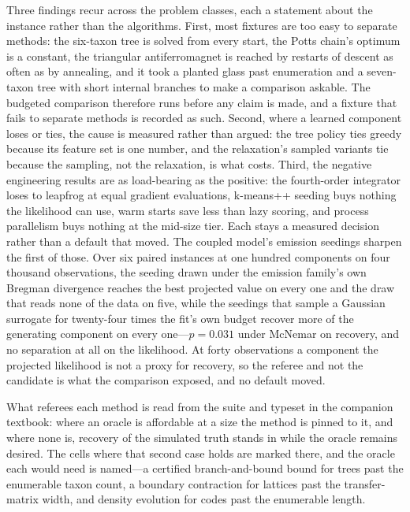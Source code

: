 \documentclass[11pt,a4paper]{article}
\begin{document}
Three findings recur across the problem classes, each a statement about the
instance rather than the algorithms. First, most fixtures are too easy to
separate methods: the six-taxon tree is solved from every start, the Potts
chain's optimum is a constant, the triangular antiferromagnet is reached by
restarts of descent as often as by annealing, and it took a planted glass past
enumeration and a seven-taxon tree with short internal branches to make a
comparison askable. The budgeted comparison therefore runs before any claim is
made, and a fixture that fails to separate methods is recorded as such. Second,
where a learned component loses or ties, the cause is measured rather than
argued: the tree policy ties greedy because its feature set is one number, and
the relaxation's sampled variants tie because the sampling, not the relaxation,
is what costs. Third, the negative engineering results are as load-bearing as
the positive: the fourth-order integrator loses to leapfrog at equal gradient
evaluations, k-means++ seeding buys nothing the likelihood can use, warm starts
save less than lazy scoring, and process parallelism buys nothing at the
mid-size tier. Each stays a measured decision rather than a default that moved.
The coupled model's emission seedings sharpen the first of those. Over six
paired instances at one hundred components on four thousand observations, the
seeding drawn under the emission family's own Bregman divergence reaches the
best projected value on every one and the draw that reads none of the data on
five, while the seedings that sample a Gaussian surrogate for twenty-four times
the fit's own budget recover more of the generating component on every
one---$p = 0.031$ under McNemar on recovery, and no separation at all on the
likelihood. At forty observations a component the projected likelihood is not a
proxy for recovery, so the referee and not the candidate is what the comparison
exposed, and no default moved.

What referees each method is read from the suite and typeset in the
companion textbook: where an oracle is affordable at a size the method is
pinned to it, and where none is, recovery of the simulated truth stands in
while the oracle remains desired. The cells where that second case holds are
marked there, and the oracle each would need is named---a certified
branch-and-bound bound for trees past the enumerable taxon count, a
boundary contraction for lattices past the transfer-matrix width, and
density evolution for codes past the enumerable length.
\end{document}
